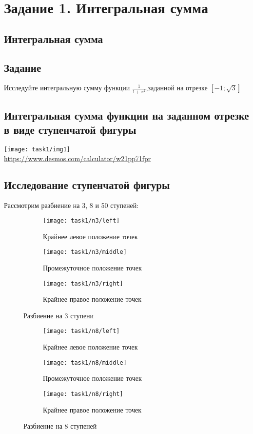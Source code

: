 \section{Задание 1. Интегральная сумма}
\subsection{Интегральная сумма}
\subsection*{Задание}
Исследуйте интегральную сумму функции $ \frac{1}{1 + x^2} $,заданной на отрезке $ \left[-1;\sqrt{3}\right]$
\subsection*{Интегральная сумма функции на заданном отрезке в виде ступенчатой фигуры}
\begin{center}
	\texttt{[image: task1/img1]}\\
	\url{https://www.desmos.com/calculator/w21pp71fpr}
\end{center}
\subsection*{Исследование ступенчатой фигуры}
Рассмотрим разбиение на 3, 8 и 50 ступеней:
\begin{figure}[H]
	\centering
	\begin{subfigure}{0.3\textwidth}
		\centering
		\texttt{[image: task1/n3/left]}\quad
		\caption*{Крайнее левое положение точек}
	\end{subfigure}
	\begin{subfigure}{0.3\textwidth}
		\centering
		\texttt{[image: task1/n3/middle]}\quad
		\caption*{Промежуточное положение точек}
	\end{subfigure}
	\begin{subfigure}{0.3\textwidth}
		\centering
		\texttt{[image: task1/n3/right]}\quad
		\caption*{Крайнее правое положение точек}
	\end{subfigure}
	\caption{Разбиение на 3 ступени}
\end{figure}

\begin{figure}[H]
	\centering
	\begin{subfigure}{0.3\textwidth}
		\centering
		\texttt{[image: task1/n8/left]}\quad
		\caption*{Крайнее левое положение точек}
	\end{subfigure}
	\begin{subfigure}{0.3\textwidth}
		\centering
		\texttt{[image: task1/n8/middle]}\quad
		\caption*{Промежуточное положение точек}
	\end{subfigure}
	\begin{subfigure}{0.3\textwidth}
		\centering
		\texttt{[image: task1/n8/right]}\quad
		\caption*{Крайнее правое положение точек}
	\end{subfigure}
	\caption{Разбиение на 8 ступеней}
\end{figure}

